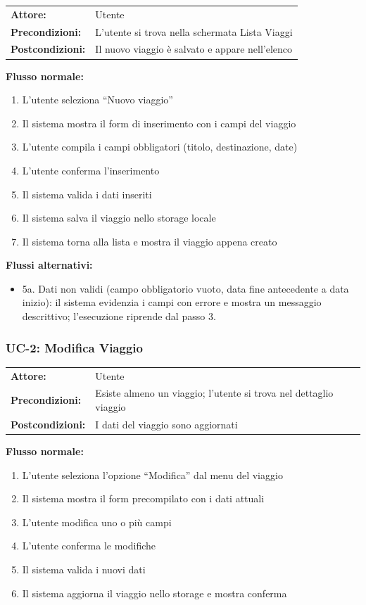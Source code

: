 \documentclass[12pt, a4paper]{article}
\makeatletter
\newcommand{\ucblock}[3]{%
  \noindent
  \begin{tabular}{@{}ll@{}}
    \textbf{Attore:}         & #1 \\
    \textbf{Precondizioni:}  & #2 \\
    \textbf{Postcondizioni:} & #3 \\
  \end{tabular}%
  \medskip
}
\makeatother
\begin{document}
\ucblock{Utente}{L'utente si trova nella schermata Lista Viaggi}{Il nuovo viaggio è salvato e appare nell'elenco}

\noindent\textbf{Flusso normale:}
\begin{enumerate}[leftmargin=1.5em, itemsep=1pt]
  \item L'utente seleziona ``Nuovo viaggio''
  \item Il sistema mostra il form di inserimento con i campi del viaggio
  \item L'utente compila i campi obbligatori (titolo, destinazione, date)
  \item L'utente conferma l'inserimento
  \item Il sistema valida i dati inseriti
  \item Il sistema salva il viaggio nello storage locale
  \item Il sistema torna alla lista e mostra il viaggio appena creato
\end{enumerate}

\noindent\textbf{Flussi alternativi:}
\begin{itemize}[leftmargin=1.5em, itemsep=1pt]
  \item 5a. Dati non validi (campo obbligatorio vuoto, data fine antecedente a data inizio):
    il sistema evidenzia i campi con errore e mostra un messaggio descrittivo;
    l'esecuzione riprende dal passo 3.
\end{itemize}

\subsubsection{UC-2: Modifica Viaggio}

\ucblock{Utente}{Esiste almeno un viaggio; l'utente si trova nel dettaglio viaggio}{I dati del viaggio sono aggiornati}

\noindent\textbf{Flusso normale:}
\begin{enumerate}[leftmargin=1.5em, itemsep=1pt]
  \item L'utente seleziona l'opzione ``Modifica'' dal menu del viaggio
  \item Il sistema mostra il form precompilato con i dati attuali
  \item L'utente modifica uno o più campi
  \item L'utente conferma le modifiche
  \item Il sistema valida i nuovi dati
  \item Il sistema aggiorna il viaggio nello storage e mostra conferma
\end{enumerate}
\end{document}
